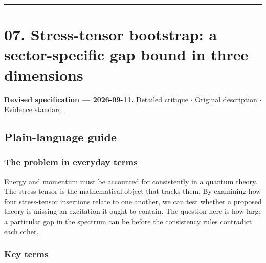 \documentclass[
  11pt,
]{article}
\begin{document}
\begin{center}\rule{0.5\linewidth}{0.5pt}\end{center}

\section{07. Stress-tensor bootstrap: a sector-specific gap bound in
three dimensions}

\textbf{Revised specification --- 2026-09-11.}
\href{https://github.com/rick-stevens-ai/Pure-Thought/blob/main/reviews/07-Extremal-CFTs-Stress-Tensor.md}{Detailed
critique} \ensuremath{\cdot}
\href{https://github.com/rick-stevens-ai/Pure-Thought/blob/main/archive/original-PRDs/07-Extremal-CFTs-Stress-Tensor.md}{Original
description} \ensuremath{\cdot}
\href{https://github.com/rick-stevens-ai/Pure-Thought/blob/main/reviews/EVIDENCE-STANDARD.md}{Evidence
standard}

\subsection{Plain-language guide}

\subsubsection{The problem in everyday terms}

Energy and momentum must be accounted for consistently in a quantum
theory. The stress tensor is the mathematical object that tracks them.
By examining how four stress-tensor insertions relate to one another, we
can test whether a proposed theory is missing an excitation it ought to
contain. The question here is how large a particular gap in the spectrum
can be before the consistency rules contradict each other.

\subsubsection{Key terms}
\end{document}
